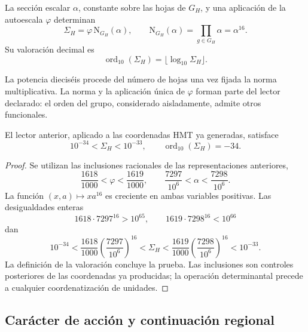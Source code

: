 \begin{definition}
\label{iv:action:norma}
La sección escalar \(\alpha\), constante sobre las hojas de \(G_H\),
y una aplicación de la autoescala \(\varphi\) determinan
\begin{equation}
 \Sigma_H=\varphi\,\mathrm N_{G_H}(\alpha),\qquad
 \mathrm N_{G_H}(\alpha)=\prod_{g\in G_H}\alpha=\alpha^{16}.
 \label{iv:action:sigma}
\end{equation}
Su valoración decimal es
\[
 \operatorname{ord}_{10}(\Sigma_H)
   =\lfloor\log_{10}\Sigma_H\rfloor.
\]
\end{definition}
La potencia dieciséis procede del número de hojas una vez fijada
la norma multiplicativa. La norma y la aplicación única de
\(\varphi\) forman parte del lector declarado: el orden del grupo,
considerado aisladamente, admite otros funcionales.

\begin{theorem}
\label{iv:action:decada}
El lector anterior, aplicado a las coordenadas HMT ya generadas,
satisface
\begin{equation}
 10^{-34}<\Sigma_H<10^{-33},
 \qquad \operatorname{ord}_{10}(\Sigma_H)=-34.
 \label{iv:action:orden-decimal}
\end{equation}
\end{theorem}
\begin{proof}
Se utilizan las inclusiones racionales de las representaciones
anteriores,
\begin{equation}
 \frac{1618}{1000}<\varphi<\frac{1619}{1000},
 \qquad
 \frac{7297}{10^6}<\alpha<\frac{7298}{10^6}.
 \label{iv:action:intervalos}
\end{equation}
La función \((x,a)\mapsto xa^{16}\) es creciente en ambas
variables positivas. Las desigualdades enteras
\[
 1618\cdot7297^{16}>10^{65},
 \qquad 1619\cdot7298^{16}<10^{66}
\]
dan
\[
 10^{-34}
 <\frac{1618}{1000}\left(\frac{7297}{10^6}\right)^{16}
 <\Sigma_H
 <\frac{1619}{1000}\left(\frac{7298}{10^6}\right)^{16}
 <10^{-33}.
\]
La definición de la valoración concluye la prueba. Las inclusiones
son controles posteriores de las coordenadas ya producidas; la
operación determinantal precede a cualquier coordenatización de unidades.
\end{proof}

\subsection{Carácter de acción y continuación regional}
\label{iv:action:caracter}

